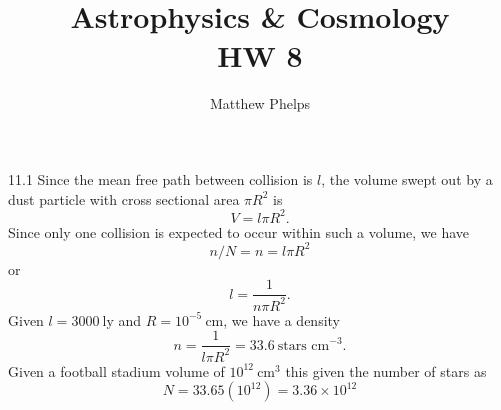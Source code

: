 \documentclass[10pt,letterpaper]{article}
\title{Astrophysics \& Cosmology\\HW 8}
\author{Matthew Phelps}
\date{}
\begin{document}
\maketitle

\benum

\item[11.1]
Since the mean free path between collision is $l$, the volume swept out by a dust particle with cross sectional area $\pi R^2$ is
\[
	V = l\pi R^2.
\]
Since only one collision is expected to occur within such a volume, we have
\[
	n/N = n = l\pi R^2
\]
or
\[
	l = \frac{1}{n\pi R^2}.
\]
Given $l = 3000\ \text{ly}$ and $R = 10^{-5}\ \text{cm}$, we have a density
\[
	n = \frac{1}{l\pi R^2} = 33.6\ \text{stars cm}^{-3}.
\]
Given a football stadium volume of $10^{12}\ \text{cm}^3$ this given the number of stars as
\[
	N = 33.65(10^{12}) = 3.36 \times 10^{12}
\]
\eenum
\end{document}
